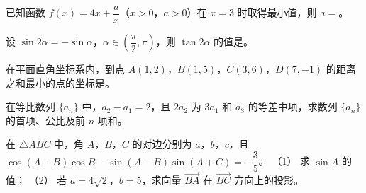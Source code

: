 \begin{question}
已知函数 $f(x)=4x+\dfrac ax$（$x>0$，$a>0$）在 $x=3$ 时取得最小值，则 $a=$\gkblank{}。
\end{question}
\begin{question}
设 $\sin2\alpha=-\sin\alpha$，$\alpha\in\left(\dfrac\pi2,\pi\right)$，则 $\tan2\alpha$ 的值是\gkblank{}。
\end{question}
\begin{question}
在平面直角坐标系内，到点 $A(1,2)$，$B(1,5)$，$C(3,6)$，$D(7,-1)$ 的距离之和最小的点的坐标是\gkblank{}。
\end{question}
\begin{question}
在等比数列 $\{a_n\}$ 中，$a_2-a_1=2$，且 $2a_2$ 为 $3a_1$ 和 $a_3$ 的等差中项，求数列 $\{a_n\}$ 的首项、公比及前 $n$ 项和。
\end{question}
\begin{question}
在 $\triangle ABC$ 中，角 $A$，$B$，$C$ 的对边分别为 $a$，$b$，$c$，且 $\cos(A-B)\cos B-\sin(A-B)\sin(A+C)=-\dfrac35$。
（1） 求 $\sin A$ 的值；
（2） 若 $a=4\sqrt2$，$b=5$，求向量 $\overrightarrow{BA}$ 在 $\overrightarrow{BC}$ 方向上的投影。
\Needspace{0.4\textheight}
\end{question}
